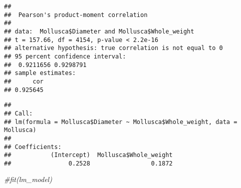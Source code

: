 \documentclass[
]{article}
\newenvironment{Shaded}{\begin{snugshade}}{\end{snugshade}}
\newcommand{\CommentTok}[1]{\textcolor[rgb]{0.56,0.35,0.01}{\textit{#1}}}
\newcommand{\DataTypeTok}[1]{\textcolor[rgb]{0.13,0.29,0.53}{#1}}
\newcommand{\KeywordTok}[1]{\textcolor[rgb]{0.13,0.29,0.53}{\textbf{#1}}}
\newcommand{\NormalTok}[1]{#1}
\newcommand{\OperatorTok}[1]{\textcolor[rgb]{0.81,0.36,0.00}{\textbf{#1}}}
\newcommand{\StringTok}[1]{\textcolor[rgb]{0.31,0.60,0.02}{#1}}
\begin{document}
\begin{Shaded}
\end{Shaded}

\begin{verbatim}
## 
##  Pearson's product-moment correlation
## 
## data:  Mollusca$Diameter and Mollusca$Whole_weight
## t = 157.66, df = 4154, p-value < 2.2e-16
## alternative hypothesis: true correlation is not equal to 0
## 95 percent confidence interval:
##  0.9211656 0.9298791
## sample estimates:
##      cor 
## 0.925645
\end{verbatim}

\begin{Shaded}
\end{Shaded}

\begin{verbatim}
## 
## Call:
## lm(formula = Mollusca$Diameter ~ Mollusca$Whole_weight, data = Mollusca)
## 
## Coefficients:
##           (Intercept)  Mollusca$Whole_weight  
##                0.2528                 0.1872
\end{verbatim}

\begin{Shaded}
\begin{Highlighting}[]
\CommentTok{#fit(lm_model)}
\end{Highlighting}
\end{Shaded}
\end{document}
